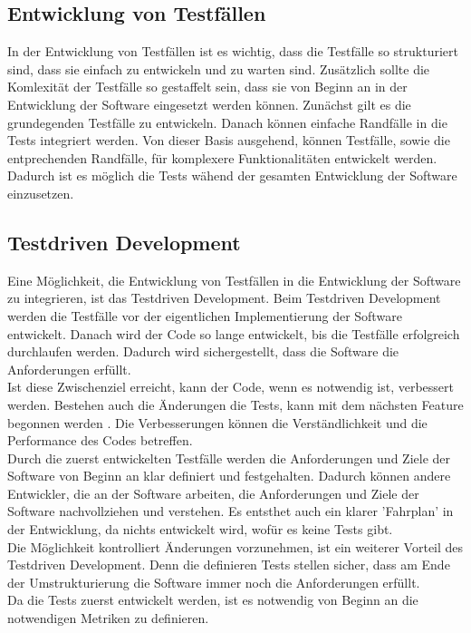 \subsection{Entwicklung von Testfällen}
In der Entwicklung von Testfällen ist es wichtig, dass die Testfälle so strukturiert sind, dass sie einfach zu entwickeln und zu warten sind.
Zusätzlich sollte die Komlexität der Testfälle so gestaffelt sein, dass sie von Beginn an in der Entwicklung der Software eingesetzt werden können.
Zunächst gilt es die grundegenden Testfälle zu entwickeln. Danach können einfache Randfälle in die Tests integriert werden. Von dieser Basis ausgehend, können Testfälle, sowie die entprechenden Randfälle, für komplexere Funktionalitäten entwickelt werden. \\ 
Dadurch ist es möglich die Tests wähend der gesamten Entwicklung der Software einzusetzen. \\
\subsection{Testdriven Development}
Eine Möglichkeit, die Entwicklung von Testfällen in die Entwicklung der Software zu integrieren, ist das Testdriven Development. 
Beim Testdriven Development werden die Testfälle vor der eigentlichen Implementierung der Software entwickelt. Danach wird der Code so lange entwickelt, bis die Testfälle erfolgreich durchlaufen werden. 
Dadurch wird sichergestellt, dass die Software die Anforderungen erfüllt. \\
Ist diese Zwischenziel erreicht, kann der Code, wenn es notwendig ist, verbessert werden. Bestehen auch die Änderungen die Tests, kann mit dem nächsten Feature begonnen werden \cite[S. 97]{ttd}. Die Verbesserungen können die Verständlichkeit und die Performance des Codes betreffen. \\
Durch die zuerst entwickelten Testfälle werden die Anforderungen und Ziele der Software von Beginn an klar definiert und festgehalten. Dadurch können andere Entwickler, die an der Software arbeiten, die Anforderungen und Ziele der Software nachvollziehen und verstehen. 
Es entsthet auch ein klarer 'Fahrplan' in der Entwicklung, da nichts entwickelt wird, wofür es keine Tests gibt. \\
Die Möglichkeit kontrolliert Änderungen vorzunehmen, ist ein weiterer Vorteil des Testdriven Development. Denn die definieren Tests stellen sicher, dass am Ende der Umstrukturierung die Software immer noch die Anforderungen erfüllt. \\
Da die Tests zuerst entwickelt werden, ist es notwendig von Beginn an die notwendigen Metriken zu definieren. 